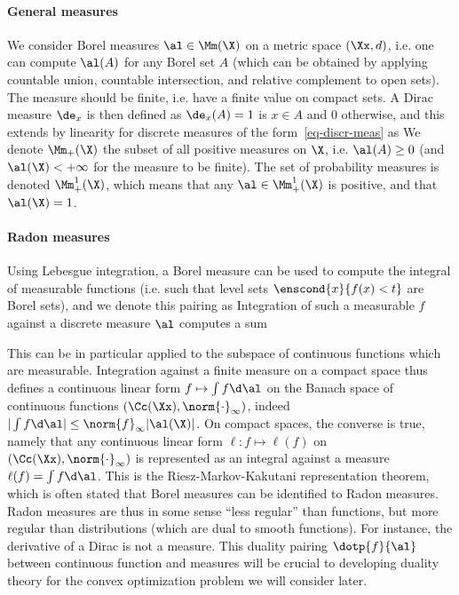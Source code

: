 \paragraph{General measures}

We consider Borel measures $\al \in \Mm(\X)$ on a metric space $(\Xx,d)$, i.e. one can compute $\al(A)$ for any Borel set $A$ (which can be obtained by applying countable union, countable intersection, and relative complement to open sets). The measure should be finite, i.e. have a finite value on compact sets.
%
A Dirac measure $\de_x$ is then defined as $\de_x(A)=1$ is $x \in A$ and $0$ otherwise, and this extends by linearity for discrete measures of the form~\eqref{eq-discr-meas} as
%
We denote $\Mm_+(\X)$ the subset of all positive measures on $\X$, i.e. $\al(A) \geq 0$ (and $\al(\X)<+\infty$ for the measure to be finite). The set of probability measures is denoted $\Mm_+^1(\X)$, which means that any $\al \in \Mm_+^1(\X)$ is positive, and that $\al(\X)=1$. 


\paragraph{Radon measures}

Using Lebesgue integration, a Borel measure can be used to compute the integral of measurable functions (i.e. such that level sets $\enscond{x}{f(x) < t}$ are Borel sets), and we denote this pairing as
Integration of such a measurable $f$ against a discrete measure $\al$ computes a sum

 
This can be in particular applied to the subspace of continuous functions which are measurable.
%
Integration against a finite measure on a compact space thus defines a continuous linear form $f \mapsto \int f \d\al$ on the Banach space of continuous functions $(\Cc(\Xx),\norm{\cdot}_\infty)$, indeed $|\int f \d\al| \leq \norm{f}_\infty |\al(\X)|$. 
%
On compact spaces, the converse is true, namely that any continuous linear form $\ell : f \mapsto \ell(f)$ on $(\Cc(\Xx),\norm{\cdot}_\infty)$ is represented as an integral against a measure $\ell(f)=\int f \d \al$. This is the  Riesz-Markov-Kakutani representation theorem, which is often stated that Borel measures can be identified to Radon measures.
%
Radon measures are thus in some sense ``less regular'' than functions, but more regular than distributions (which are dual to smooth functions). For instance, the derivative of a Dirac is not a measure.
%
This duality pairing $\dotp{f}{\al}$ between continuous function and measures will be crucial to developing duality theory for the convex optimization problem we will consider later. 

